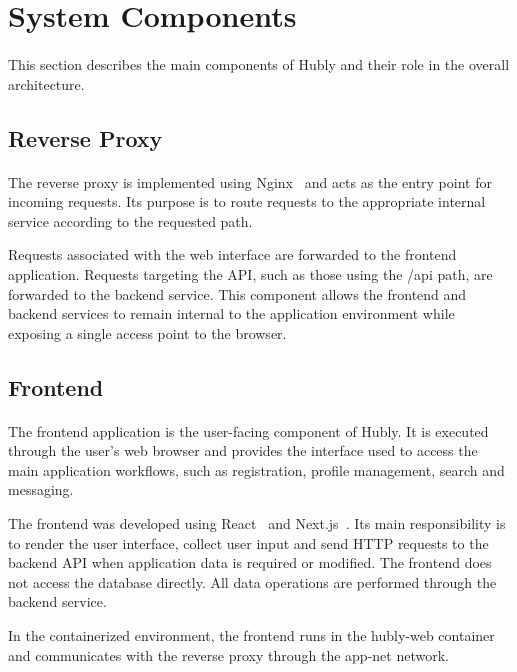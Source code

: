 \section{System Components}

\paragraph{}This section describes the main components of Hubly and their role in the overall architecture.

\subsection{Reverse Proxy}
\paragraph{}The reverse proxy is implemented using Nginx~\cite{nginx} and acts as the entry point for incoming requests. Its purpose is to route requests to the appropriate internal service according to the requested path.

Requests associated with the web interface are forwarded to the frontend application. Requests targeting the API, such as those using the /api path, are forwarded to the backend service. This component allows the frontend and backend services to remain internal to the application environment while exposing a single access point to the browser.

\subsection{Frontend}
\paragraph{}The frontend application is the user-facing component of Hubly. It is executed through the user’s web browser and provides the interface used to access the main application workflows, such as registration, profile management, search and messaging.

The frontend was developed using React~\cite{react} and Next.js~\cite{nextjs}. Its main responsibility is to render the user interface, collect user input and send HTTP requests to the backend API when application data is required or modified. The frontend does not access the database directly. All data operations are performed through the backend service.

In the containerized environment, the frontend runs in the hubly-web container and communicates with the reverse proxy through the app-net network.

